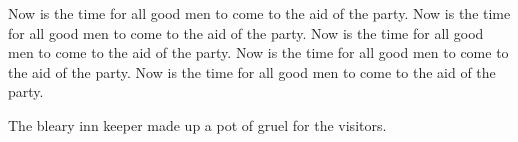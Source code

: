 \documentclass[a4paper]{article}
\begin{document}
Now is the time for all good men to come to the aid of the party. Now is the
time for all good men to come to the aid of the party. Now is the time for all
good men to come to the aid of the party. Now is the time for all good men to
come to the aid of the party. Now is the time for all good men to come to the
aid of the party.

The bleary inn keeper made up a pot of gruel for the visitors.
\end{document}
